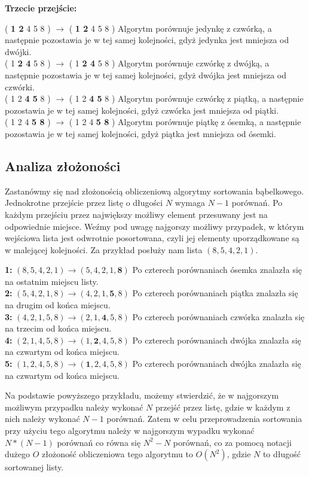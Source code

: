 \documentclass[knowledge.tex]{subfiles}
\begin{document}
    \textbf{Trzecie przejście:}
    \begin{addmargin}[2em]{0em}
        ( \textbf{1 2} 4 5 8 ) $\rightarrow$ ( \textbf{1 2} 4 5 8 ) Algorytm porównuje jedynkę z czwórką, a następnie pozostawia je w tej samej kolejności, gdyż jedynka jest mniejsza od dwójki.\\[0.1cm]
        ( 1 \textbf{2 4} 5 8 ) $\rightarrow$ ( 1 \textbf{2 4} 5 8 ) Algorytm porównuje czwórkę z dwójką, a następnie pozostawia je w tej samej kolejności, gdyż dwójka jest mniejsza od czwórki.\\[0.1cm]
        ( 1 2 \textbf{4 5} 8 ) $\rightarrow$ ( 1 2 \textbf{4 5} 8 ) Algorytm porównuje czwórkę z piątką, a następnie pozostawia je w tej samej kolejności, gdyż czwórka jest mniejsza od piątki.\\[0.1cm]
        ( 1 2 4 \textbf{5 8} ) $\rightarrow$ ( 1 2 4 \textbf{5 8} ) Algorytm porównuje piątkę z ósemką, a następnie pozostawia je w tej samej kolejności, gdyż piątka jest mniejsza od ósemki.\\[0.1cm]
    \end{addmargin}
    \subsection*{Analiza złożoności}
    Zastanówmy się nad złożonością obliczeniową algorytmy sortowania bąbelkowego. Jednokrotne przejście przez listę o długości $N$ wymaga $N - 1$ porównań. Po każdym przejściu przez największy możliwy element przesuwany jest na odpowiednie miejsce. Weźmy pod uwagę najgorszy możliwy przypadek, w którym wejściowa lista jest odwrotnie posortowana, czyli jej elementy uporządkowane są w malejącej kolejności. Za przykład posłuży nam lista $( 8, 5, 4, 2, 1 )$.
    \begin{addmargin}[2em]{0em}
        \textbf{1:} $( 8, 5, 4, 2, 1 ) \rightarrow ( 5, 4, 2, 1, \textbf{8} )$ Po czterech porównaniach ósemka znalazła się na ostatnim miejscu listy.\\[0.1cm]
        \textbf{2:} $( 5,4,2,1,8 ) \rightarrow ( 4, 2, 1, \textbf{5}, 8 )$ Po czterech porównaniach piątka znalazła się na drugim od końca miejscu.\\[0.1cm]
        \textbf{3:} $( 4, 2, 1, 5, 8 ) \rightarrow ( 2, 1, \textbf{4}, 5, 8 )$ Po czterech porównaniach czwórka znalazła się na trzecim od końca miejscu.\\[0.1cm]
        \textbf{4:} $( 2, 1, 4, 5, 8 ) \rightarrow ( 1, \textbf{2}, 4, 5, 8 )$ Po czterech porównaniach dwójka znalazła się na czwartym od końca miejscu.\\[0.1cm]
        \textbf{5:} $( 1, 2, 4, 5, 8 ) \rightarrow ( \textbf{1}, 2, 4, 5, 8 )$ Po czterech porównaniach dwójka znalazła się na czwartym od końca miejscu.
    \end{addmargin}
    Na podstawie powyższego przykładu, możemy stwierdzić, że w najgorszym możliwym przypadku należy wykonać $N$ przejść przez listę, gdzie w każdym z nich należy wykonać $N - 1$ porównań. Zatem w celu przeprowadzenia sortowania przy użyciu tego algorytmu należy w najgorszym wypadku wykonać $N * (N - 1)$ porównań co równa się $N^2 - N$ porównań, co za pomocą notacji dużego $O$ złożoność obliczeniowa tego algorytmu to $O(N^2)$, gdzie $N$ to długość sortowanej listy.
    
\end{document}
